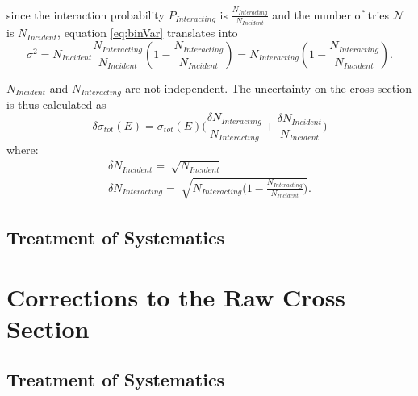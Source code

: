 since the interaction probability $P_{Interacting}$ is $\frac{ N_{Interacting}}{N_{Incident}}$ and the number of tries $\mathcal{N}$ is $N_{Incident}$, equation \ref{eq:binVar} translates into
\begin{equation}
\sigma^2 = N_{Incident}\frac{ N_{Interacting}}{N_{Incident}} (1-\frac{ N_{Interacting}}{N_{Incident}}) = N_{Interacting}(1-\frac{ N_{Interacting}}{N_{Incident}}).
\end{equation}

$N_{Incident}$ and $N_{Interacting}$ are not independent.
The uncertainty on the cross section is thus calculated as 
\begin{equation}
\delta\sigma_{tot}(E) = \sigma_{tot}(E) \Big(\frac{\delta N_{Interacting}}{N_{Interacting}}+\frac{\delta N_{Incident}}{N_{Incident}}\Big) 
\end{equation}
where:
\begin{eqnarray}
\delta N_{Incident} = \sqrt[]{N_{Incident}} \\
\delta N_{Interacting} = \sqrt[]{N_{Interacting}\Big(1-\frac{ N_{Interacting}}{N_{Incident}}\Big)}.
\end{eqnarray}



\subsection{Treatment of Systematics} \label{ch:SysUncertaintyXSRaw}



\section{Corrections to the Raw Cross Section}\label{ch:PionXSCorrections}
\subsection{Treatment of Systematics}

